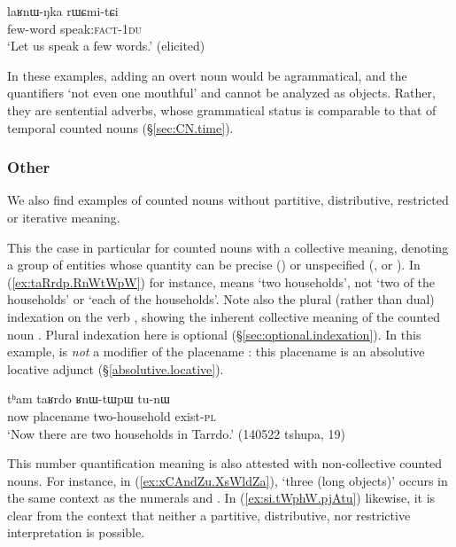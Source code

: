 \begin{exe}
	\ex \label{ex:laRnWNka.rWCmitCi}
	\gll laʁnɯ-ŋka rɯɕmi-tɕi \\
	few-word speak:\textsc{fact}-\textsc{1du} \\
	\glt `Let us speak a few words.' (elicited)
\end{exe}

In these examples, adding an overt noun would be agrammatical, and the quantifiers  `not even one mouthful' and  cannot be analyzed as objects. Rather, they are sentential adverbs, whose grammatical status is comparable to that of temporal counted nouns (§\ref{sec:CN.time}).


\subsubsection{Other}
We also find examples of counted nouns without partitive, distributive, restricted or iterative meaning.

This the case in particular for counted nouns with a collective meaning, denoting a group of entities whose quantity can be precise () or unspecified (,  or ). In (\ref{ex:taRrdp.RnWtWpW}) for instance,  means `two households', not `two of the households' or `each of the households'. Note also the plural (rather than dual) indexation on the verb , showing the inherent collective meaning of the counted noun . Plural indexation here is optional (§\ref{sec:optional.indexation}). In this example,  is \textit{not} a modifier of the placename : this placename is an absolutive locative adjunct (§\ref{absolutive.locative}).

\begin{exe}
	\ex \label{ex:taRrdp.RnWtWpW}
	\gll tʰam taʁrdo ʁnɯ-tɯpɯ tu-nɯ \\
	now placename two-household exist-\textsc{pl} \\
	\glt `Now there are two households in Tarrdo.' (140522 tshupa, 19)
\end{exe} 


This number quantification meaning is also attested with non-collective counted nouns. For instance, in (\ref{ex:xCAndZu.XsWldZa}),  `three (long objects)' occurs in the same context as the numerals  and . In (\ref{ex:si.tWphW.pjAtu}) likewise, it is clear from the context that neither a partitive, distributive, nor restrictive interpretation is possible.

